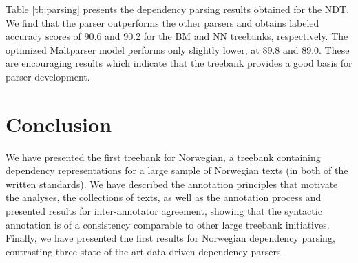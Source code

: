 \documentclass[11pt,a4paper]{article}
\begin{document}
Table \ref{tb:parsing} presents the dependency parsing results
obtained for the NDT. We find that the  parser
outperforms the other parsers and obtains labeled accuracy scores of
90.6 and 90.2 for the BM and NN treebanks, respectively.  The
optimized Maltparser model performs only slightly lower, at 89.8 and
89.0.  These are encouraging results which indicate that the treebank
provides a good basis for parser development.

\section{Conclusion}
We have presented the first treebank for Norwegian, a treebank
containing dependency representations for a large sample of Norwegian
texts (in both of the written standards). We have described the
annotation principles that motivate the analyses, the collections of
texts, as well as the annotation process and presented results for
inter-annotator agreement, showing that the syntactic annotation is of
a consistency comparable to other large treebank initiatives. Finally,
we have presented the first results for Norwegian dependency parsing,
contrasting three state-of-the-art data-driven dependency parsers.


\clearpage

\end{document}
